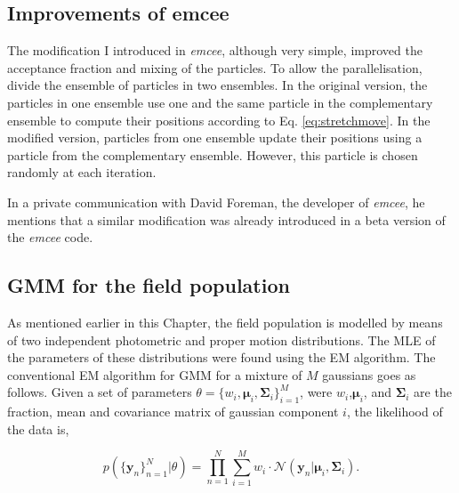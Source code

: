 \subsection{Improvements of emcee}
The modification I introduced in \emph{emcee}, although very simple, improved the acceptance fraction and mixing of the particles.
To allow the parallelisation, \citet{Foreman2013} divide the ensemble of particles in two ensembles. In the original version, the particles in one ensemble use one and the same particle in the complementary ensemble to compute their positions according to Eq. \ref{eq:stretchmove}. In the modified version, particles from one ensemble update their positions using a particle from the complementary ensemble. However, this particle is chosen randomly at each iteration. 

In a private communication with David Foreman, the developer of \emph{emcee}, he mentions that a similar modification was already introduced in a beta version of the \emph{emcee} code.

\subsection{GMM for the field population}
As mentioned earlier in this Chapter, the field population is modelled by means of two independent photometric and proper motion distributions. The MLE of the parameters of these distributions were found using the EM algorithm.  The conventional EM algorithm for GMM \citep{Dempster1977} for a mixture of $M$ gaussians goes as follows. Given a set of parameters $\theta=\{w_i,\boldsymbol{\mu}_i,\boldsymbol{\Sigma}_i\}_{i=1}^M$, were $w_i$,$\boldsymbol{\mu}_i$, and $\boldsymbol{\Sigma}_i$ are the fraction, mean and covariance matrix of gaussian component $i$, the likelihood of the data is,

\begin{equation}
p(\{\mathbf{y}_n\}_{n=1}^N|\theta)=\prod_{n=1}^N {\sum_{i=1} ^M {w_i\cdot \mathcal{N}(\mathbf{y}_n|\boldsymbol{\mu}_i,\boldsymbol{\Sigma}_i)}}.
\end{equation}

